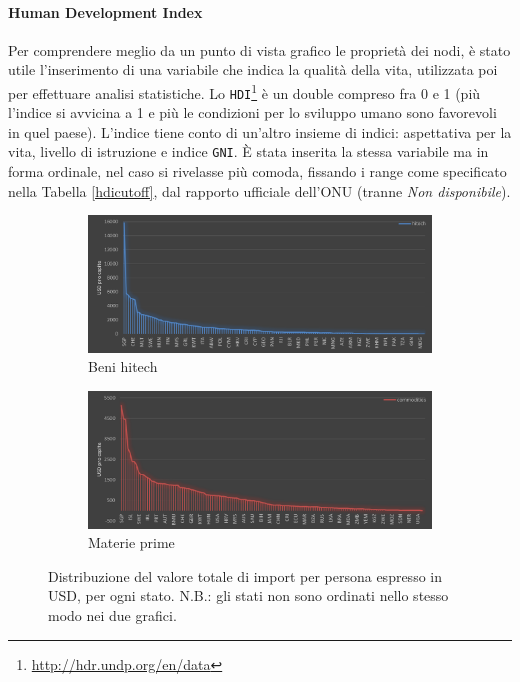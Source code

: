 \documentclass[]{article}
\begin{document}
\begin{multicols}{2}
	\paragraph{Human Development Index} Per comprendere meglio da un punto di vista grafico le proprietà dei nodi, è stato utile l'inserimento di una variabile che indica la qualità della vita, utilizzata poi  per effettuare analisi statistiche. Lo \texttt{HDI}\footnote{\url{http://hdr.undp.org/en/data}} è un double compreso fra 0 e 1 (più l'indice si avvicina a 1 e più le condizioni per lo sviluppo umano sono favorevoli in quel paese). L'indice tiene conto di un'altro insieme di indici: aspettativa per la vita, livello di istruzione e indice \texttt{GNI}. È stata inserita la stessa variabile ma in forma ordinale, nel caso si rivelasse più comoda, fissando i range come specificato nella Tabella \ref{hdicutoff}, dal rapporto ufficiale dell'ONU (tranne \textit{Non disponibile}).
	\begin{figure}[b]
		\centering
		\begin{subfigure}[b]{.496\textwidth}
			\includegraphics[width=\textwidth]{img/hitech-serie.png}
			\caption{Beni hitech}
		\end{subfigure}
		\begin{subfigure}[b]{.496\textwidth}
			\includegraphics[width=\textwidth]{img/com-serie.png}
			\caption{Materie prime}
		\end{subfigure}
		\caption{Distribuzione del valore totale di import per persona espresso in USD, per ogni stato. N.B.: gli stati non sono ordinati nello stesso modo nei due grafici.}

\end{figure}
\end{multicols}
\end{document}
